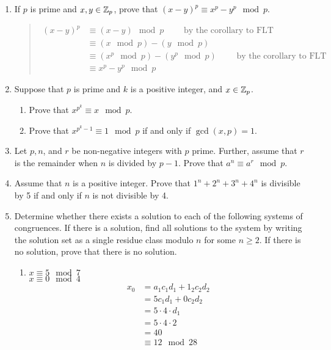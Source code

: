 \documentclass{hw}
\begin{document}

\begin{enumerate}
\item If $p$ is prime and $x,y\in\mathbb{Z}_{p}$, prove that $(x-y)^{p}\equiv x^{p}-y^{p}\mod p$.
\begin{quote}
\begin{align*}
(x-y)^{p} &\equiv (x-y)\mod p \qquad\text{ by the corollary to FLT}\\
&\equiv (x\mod p) - (y\mod p)\\
&\equiv (x^{p}\mod p) - (y^{p}\mod p)\qquad\text{ by the corollary to FLT}\\
&\equiv x^{p} - y^{p} \mod p
\end{align*}
\end{quote}

\item Suppose that $p$ is prime and $k$ is a positive integer, and $x\in\mathbb{Z}_{p}$.
\begin{enumerate}
\item Prove that $x^{p^{k}}\equiv x\mod p$.

\item Prove that $x^{p^{k}-1}\equiv 1\mod p$ if and only if $\gcd{(x,p)}=1$.
\end{enumerate}

\item Let $p,n$, and $r$ be non-negative integers with $p$ prime. Further, assume that $r$ is the
remainder when $n$ is divided by $p-1$. Prove that $a^{n}\equiv a^{r}\mod p$.

\item Assume that $n$ is a positive integer. Prove that $1^{n}+2^{n}+3^{n}+4^{n}$ is divisible by
5 if and only if $n$ is not divisible by 4.

\item Determine whether there exists a solution to each of the following systems of congruences.  If
there is a solution, find all solutions to the system by writing the solution set as a single residue
class modulo $n$ for some $n\geq 2$. If there is no solution, prove that there is no solution.
\begin{enumerate}
\item $x\equiv5\mod7$\\
$x\equiv0\mod4$
\begin{align*}
x_{0}&=a_{1}c_{1}d_{1}+1_{2}c_{2}d_{2}\\
&= 5c_{1}d_{1} + 0c_{2}d_{2}\\
&= 5\cdot4\cdot d_{1}\\
&= 5\cdot4\cdot2\\
&= 40\\
&\equiv 12\mod28
\end{align*}


\end{enumerate}
\end{enumerate}
\end{document}
